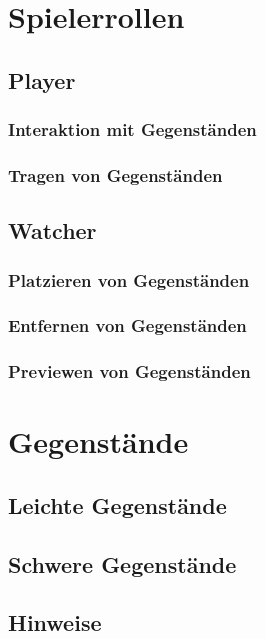 \section{Spielerrollen}

\subsection{Player}

\subsubsection{Interaktion mit Gegenständen}

\subsubsection{Tragen von Gegenständen}

\subsection{Watcher}

\subsubsection{Platzieren von Gegenständen}

\subsubsection{Entfernen von Gegenständen}

\subsubsection{Previewen von Gegenständen}

\section{Gegenstände}

\subsection{Leichte Gegenstände}

\subsection{Schwere Gegenstände}

\subsection{Hinweise}

